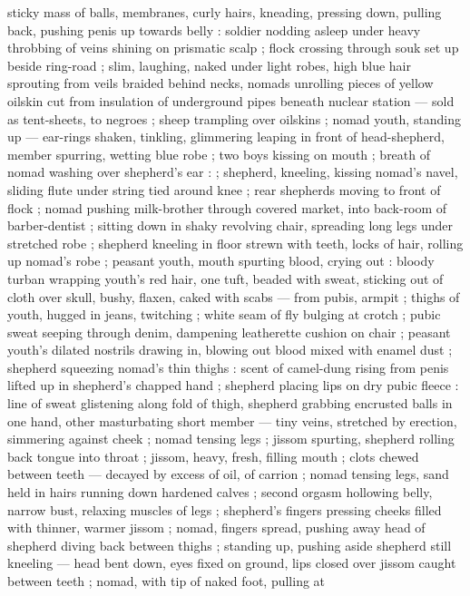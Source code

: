sticky mass of balls, membranes, curly hairs, kneading, pressing down, pulling back, pushing penis
up towards belly : soldier nodding asleep under heavy throbbing of veins shining on prismatic scalp
; flock crossing through souk set up beside ring-road ; slim, laughing, naked under light robes,
high blue hair sprouting from veils braided behind necks, nomads unrolling pieces of yellow oilskin
cut from insulation of underground pipes beneath nuclear station --- sold as tent-sheets, to negroes
; sheep trampling over oilskins ; nomad youth, standing up --- ear-rings shaken, tinkling,
glimmering {\dashcom} leaping in front of head-shepherd, member spurring, wetting blue robe ; two
boys kissing on mouth ; breath of nomad washing over shepherd's ear : {\td}  ; shepherd, kneeling, kissing nomad's navel, sliding flute under string
tied around knee ; rear shepherds moving to front of flock ; nomad pushing milk-brother through
covered market, into back-room of barber-dentist ; sitting down in shaky revolving chair, spreading
long legs under stretched robe ; shepherd kneeling in floor strewn with teeth, locks of hair,
rolling up nomad's robe ; peasant youth, mouth spurting blood, crying out : bloody turban wrapping
youth's red hair, one tuft, beaded with sweat, sticking out of cloth over skull, bushy, flaxen,
caked with scabs --- from pubis, armpit ; thighs of youth, hugged in jeans, twitching ; white seam
of fly bulging at crotch ; pubic sweat seeping through denim, dampening leatherette cushion on chair
; peasant youth's dilated nostrils drawing in, blowing out blood mixed with enamel dust ; shepherd
squeezing nomad's thin thighs : scent of camel-dung rising from penis lifted up in shepherd's
chapped hand ; shepherd placing %
lips on dry pubic fleece : line of sweat glistening along fold of thigh, shepherd grabbing encrusted
balls in one hand, other masturbating short member --- tiny veins, stretched by erection, simmering
against cheek ; nomad tensing legs ; jissom spurting, shepherd rolling back tongue into throat ;
jissom, heavy, fresh, filling mouth ; clots chewed between teeth --- decayed by excess of oil, of
carrion ; nomad tensing legs, sand held in hairs running down hardened calves ; second orgasm
hollowing belly, narrow bust, relaxing muscles of legs ; shepherd's fingers pressing cheeks filled
with thinner, warmer jissom ; nomad, fingers spread, pushing away head of shepherd diving back
between thighs ; standing up, pushing aside shepherd still kneeling --- head bent down, eyes fixed
on ground, lips closed over jissom caught between teeth ; nomad, with tip of naked foot, pulling at
